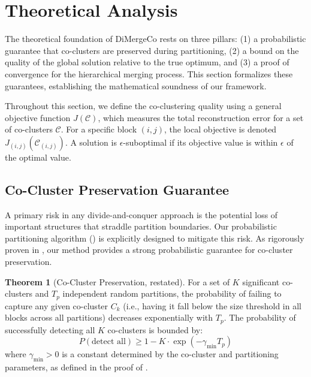 \documentclass[journal]{IEEEtran}
\theoremstyle{definition}
\newtheorem{theorem}{Theorem}
\theoremstyle{remark} %
\begin{document}
\section{Theoretical Analysis}
\label{sec:theoretical-foundations}
{\color{blue}
The theoretical foundation of DiMergeCo rests on three pillars: (1) a probabilistic guarantee that co-clusters are preserved during partitioning, (2) a bound on the quality of the global solution relative to the true optimum, and (3) a proof of convergence for the hierarchical merging process. This section formalizes these guarantees, establishing the mathematical soundness of our framework.

Throughout this section, we define the co-clustering quality using a general objective function $J(\mathcal{C})$, which measures the total reconstruction error for a set of co-clusters $\mathcal{C}$. For a specific block $(i,j)$, the local objective is denoted $J_{(i,j)}(\mathcal{C}_{(i,j)})$. A solution is $\epsilon$-suboptimal if its objective value is within $\epsilon$ of the optimal value.

\subsection{Co-Cluster Preservation Guarantee}
\label{subsec:co-cluster-preservation-guarantee}
A primary risk in any divide-and-conquer approach is the potential loss of important structures that straddle partition boundaries. Our probabilistic partitioning algorithm () is explicitly designed to mitigate this risk. As rigorously proven in , our method provides a strong probabilistic guarantee for co-cluster preservation.

\begin{theorem}[Co-Cluster Preservation, restated]
    \label{thm:co-cluster-preservation}
    For a set of $K$ significant co-clusters and $T_p$ independent random partitions, the probability of failing to capture any given co-cluster $C_k$ (i.e., having it fall below the size threshold in all blocks across all partitions) decreases exponentially with $T_p$. The probability of successfully detecting all $K$ co-clusters is bounded by:
    \begin{equation}
        P(\text{detect all}) \ge 1 - K \cdot \exp(-\gamma_{\min} T_p)
    \end{equation}
    where $\gamma_{\min} > 0$ is a constant determined by the co-cluster and partitioning parameters, as defined in the proof of .
\end{theorem}

}
\end{document}
